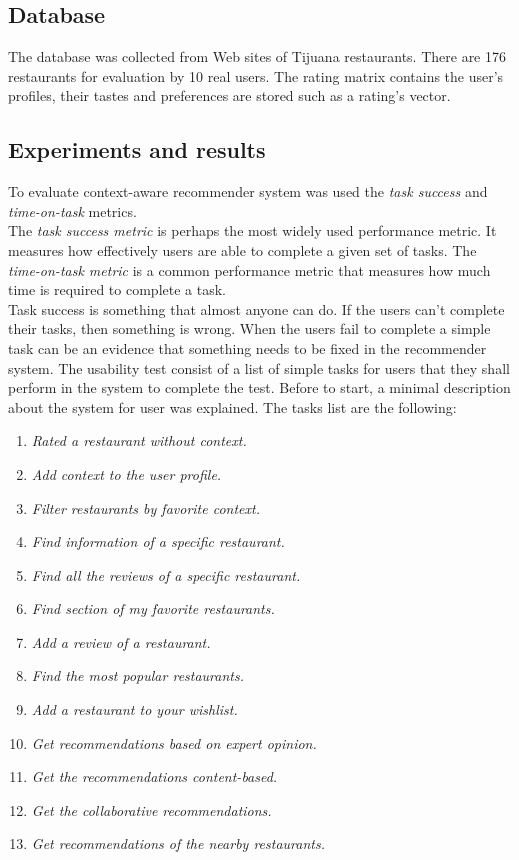 \subsection{Database}\label{sec:4.1}

The database was collected from Web sites of Tijuana restaurants. There are 176
restaurants for evaluation by 10 real users. The rating matrix contains the
user’s profiles, their tastes and preferences are stored such as a rating’s
vector.

\subsection{Experiments and results}\label{sec:4.2}

To evaluate context-aware recommender system was used the \textit{task success}
and \textit{time-on-task} metrics. \\ The \textit{task success metric} is
perhaps the most widely used performance metric. It measures how effectively
users are able to complete a given set of tasks.  The \textit{time-on-task
metric} is a common performance metric that measures how much time is required
to complete a task\cite{albert2013measuring}.\\ Task success is something that
almost anyone can do.  If the users can’t complete their tasks, then something
is wrong.  When the users fail to complete a simple task can be an evidence that
something needs to be fixed in the recommender system.  The usability test
consist of a list of simple tasks for users that they shall perform in the
system to complete the test. Before to start, a minimal description about the
system for user was explained. The tasks list are the following:

\begin{enumerate} 
\item \textit{Rated a restaurant without context.}
\item \textit{Add context to the user profile.}
\item \textit{Filter restaurants by favorite context.}
\item \textit{Find information of a specific restaurant.}
\item \textit{Find all the reviews of a specific restaurant.} 
\item \textit{Find section of my favorite restaurants.}
\item \textit{Add a review of a restaurant.}
\item \textit{Find the most popular restaurants.}
\item \textit{Add a restaurant to your wishlist.}
\item \textit{Get recommendations based on expert opinion.} 
\item \textit{Get the recommendations content-based.}
\item \textit{Get the collaborative recommendations.}
\item \textit{Get recommendations of the nearby restaurants.}
\end{enumerate} 

